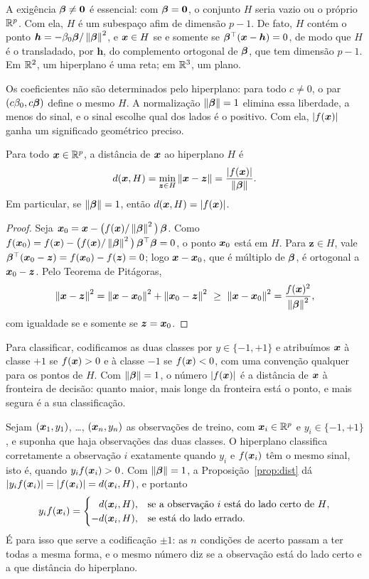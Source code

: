 \documentclass[11pt,a4paper]{article}
\begin{document}
A exigência $\bm{\beta}\ne\bm 0$ é essencial: com $\bm{\beta}=\bm 0$, o conjunto $H$ seria
vazio ou o próprio $\mathbb{R}^p$. Com ela, $H$ é um subespaço afim de dimensão $p-1$. De
fato, $H$ contém o ponto $\bm h=-\beta_0\bm{\beta}/\left\lVert \bm{\beta} \right\rVert^2$, e $\bm{x}\in H$ se e
somente se $\bm{\beta}^\top(\bm{x}-\bm h)=0$, de modo que $H$ é o transladado, por $\bm h$, do
complemento ortogonal de $\bm{\beta}$, que tem dimensão $p-1$. Em $\mathbb{R}^2$, um hiperplano é
uma reta; em $\mathbb{R}^3$, um plano.

Os coeficientes não são determinados pelo hiperplano: para todo $c\ne0$, o par
$(c\beta_0,c\bm{\beta})$ define o mesmo $H$. A normalização $\left\lVert \bm{\beta} \right\rVert=1$ elimina essa
liberdade, a menos do sinal, e o sinal escolhe qual dos lados é o positivo. Com ela,
$\left\lvert f(\bm{x}) \right\rvert$ ganha um significado geométrico preciso.

\begin{proposicao}\label{prop:dist}
Para todo $\bm{x}\in\mathbb{R}^p$, a distância de $\bm{x}$ ao hiperplano $H$ é
\[
  d(\bm{x},H)=\min_{\bm z\in H}\left\lVert \bm{x}-\bm z \right\rVert=\frac{\left\lvert f(\bm{x}) \right\rvert}{\left\lVert \bm{\beta} \right\rVert} .
\]
Em particular, se $\left\lVert \bm{\beta} \right\rVert=1$, então $d(\bm{x},H)=\left\lvert f(\bm{x}) \right\rvert$.
\end{proposicao}
\begin{proof}
Seja $\bm{x}_0=\bm{x}-\big(f(\bm{x})/\left\lVert \bm{\beta} \right\rVert^2\big)\,\bm{\beta}$. Como
$f(\bm{x}_0)=f(\bm{x})-\big(f(\bm{x})/\left\lVert \bm{\beta} \right\rVert^2\big)\,\bm{\beta}^\top\bm{\beta}=0$, o ponto $\bm{x}_0$
está em $H$. Para $\bm z\in H$, vale $\bm{\beta}^\top(\bm{x}_0-\bm z)=f(\bm{x}_0)-f(\bm z)=0$; logo
$\bm{x}-\bm{x}_0$, que é múltiplo de $\bm{\beta}$, é ortogonal a $\bm{x}_0-\bm z$. Pelo Teorema de
Pitágoras,
\[
  \left\lVert \bm{x}-\bm z \right\rVert^2=\left\lVert \bm{x}-\bm{x}_0 \right\rVert^2+\left\lVert \bm{x}_0-\bm z \right\rVert^2\ \ge\ \left\lVert \bm{x}-\bm{x}_0 \right\rVert^2
  =\frac{f(\bm{x})^2}{\left\lVert \bm{\beta} \right\rVert^2},
\]
com igualdade se e somente se $\bm z=\bm{x}_0$.
\end{proof}

Para classificar, codificamos as duas classes por $y\in\{-1,+1\}$ e atribuímos $\bm{x}$ à
classe $+1$ se $f(\bm{x})>0$ e à classe $-1$ se $f(\bm{x})<0$, com uma convenção qualquer para
os pontos de $H$. Com $\left\lVert \bm{\beta} \right\rVert=1$, o número $\left\lvert f(\bm{x}) \right\rvert$ é a distância de $\bm{x}$
à fronteira de decisão: quanto maior, mais longe da fronteira está o ponto, e mais
segura é a sua classificação.

Sejam $(\bm{x}_1,y_1)$, \dots, $(\bm{x}_n,y_n)$ as observações de treino, com $\bm{x}_i\in\mathbb{R}^p$ e
$y_i\in\{-1,+1\}$, e suponha que haja observações das duas classes. O hiperplano
classifica corretamente a observação $i$ exatamente quando $y_i$ e $f(\bm{x}_i)$ têm o
mesmo sinal, isto é, quando $y_if(\bm{x}_i)>0$. Com $\left\lVert \bm{\beta} \right\rVert=1$, a
Proposição~\ref{prop:dist} dá $\left\lvert y_if(\bm{x}_i) \right\rvert=\left\lvert f(\bm{x}_i) \right\rvert=d(\bm{x}_i,H)$, e portanto
\[
  y_if(\bm{x}_i)=\begin{cases}
    \phantom{-}d(\bm{x}_i,H), & \text{se a observação $i$ está do lado certo de $H$},\\
    -d(\bm{x}_i,H), & \text{se está do lado errado}.
  \end{cases}
\]
É para isso que serve a codificação $\pm1$: as $n$ condições de acerto passam a ter
todas a mesma forma, e o mesmo número diz se a observação está do lado certo e a que
distância do hiperplano.
\end{document}
